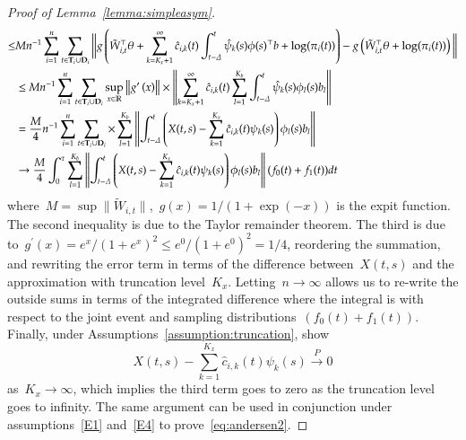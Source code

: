 \documentclass[12pt]{amsart}
\def\bfT{{\bf T}}
\def\bfD{{\bf D}}
\begin{document}
\begin{proof}[Proof of Lemma~\ref{lemma:simpleasym}]
\begin{align*}
  \leq & M n^{-1} \sum_{i=1}^n \sum_{t \in \bfT_i \cup \bfD_i} \bigg \| g
         \left( \tilde W_{i,t}^\top \theta  + \sum_{k=K_x+1}^\infty \hat
         c_{i,k} (t) \int_{t-\Delta}^t \hat \psi_k (s) \phi (s)^\top b
         + \log (\pi_i (t) ) \right) - g \left( \tilde W_{i,t}^\top
         \theta + \log (\pi_i (t)) \right) \bigg \| \\
&\leq M n^{-1} \sum_{i=1}^n \sum_{t \in \bfT_i \cup \bfD_i}
    \sup_{x \in \mathbb{R}} \left \| g^\prime \left( x \right)
  \right\| \times \left \| \sum_{k=K_x+1}^\infty \hat c_{i,k} (t)
  \sum_{l=1}^{K_b} \int_{t-\Delta}^t \hat \psi_k (s) \phi_l (s) b_l
  \right \| \\
&= \frac{M}{4} n^{-1} \sum_{i=1}^n \sum_{t \in \bfT_i \cup \bfD_i}
  \times \sum_{l=1}^{K_b} \left \| \int_{t-\Delta}^t
  \left( X(t,s) - \sum_{k=1}^{K_x} \hat c_{i,k} (t) \psi_k (s) \right)
  \phi_l (s) b_l\right \| \\
&\to \frac{M}{4} \int_0^\tau \sum_{l=1}^{K_b} \left \| \int_{t-\Delta}^t
  \left( X(t,s) - \sum_{k=1}^{K_x} \hat c_{i,k} (t) \psi_k (s) \right)
  \phi_l (s) b_l\right \| (f_0(t) + f_1(t)) dt
\end{align*}
where~$M = \sup \| \tilde W_{i,t} \|$,~$g(x) = 1/(1+\exp(-x))$ is the
expit function.
The second inequality is due to the Taylor remainder theorem. The third is due to~$g^\prime (x) = e^x/(1+e^x)^2 \leq e^0/(1+e^0)^2 = 1/4$, reordering the summation, and rewriting the error term in terms of the difference between~$X(t,s)$ and the approximation with truncation level~$K_x$. Letting~$n \to \infty$ allows us to re-write the outside sums in terms of the integrated difference where the integral is with respect to the joint event and sampling distributions~$(f_0(t) + f_1 (t))$. Finally, under Assumptions~\ref{assumption:truncation}, \cite{Park2018} show
\[
X(t,s) - \sum_{k=1}^{K_x} \hat c_{i,k} (t) \psi_k (s) \overset{P}{\to} 0
\]
as~$K_x \to \infty$, which implies the third term goes to zero as the truncation level goes to infinity. The same argument can be used in conjunction under assumptions~\ref{E1} and~\ref{E4} to prove~\eqref{eq:andersen2}.


\end{proof}
\end{document}
